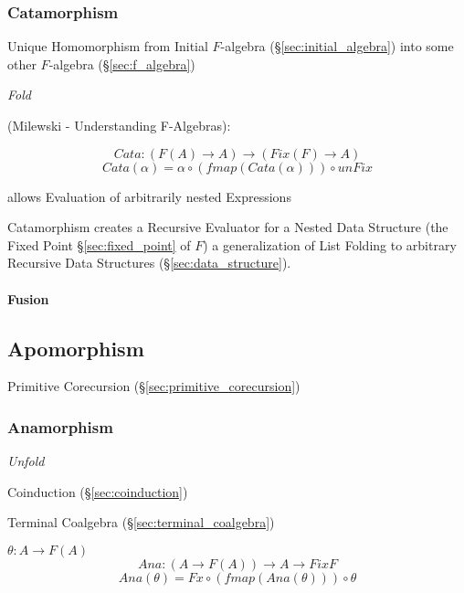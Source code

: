 \subsubsection{Catamorphism}\label{sec:catamorphism}

Unique Homomorphism from Initial $F$-algebra
(\S\ref{sec:initial_algebra}) into some other $F$-algebra
(\S\ref{sec:f_algebra})

\emph{Fold}

(Milewski - Understanding F-Algebras):

\[
  Cata : (F (A) \rightarrow A) \rightarrow (Fix (F) \rightarrow A)
\]\[
  Cata (\alpha) = \alpha \circ (fmap (Cata (\alpha))) \circ unFix
\]

allows Evaluation of arbitrarily nested Expressions

Catamorphism creates a Recursive Evaluator for a Nested Data Structure
(the Fixed Point \S\ref{sec:fixed_point} of $F$) a generalization of
List Folding to arbitrary Recursive Data Structures
(\S\ref{sec:data_structure}).



\paragraph{Fusion}\label{sec:fusion}



\subsection{Apomorphism}\label{sec:apomorphism}

Primitive Corecursion (\S\ref{sec:primitive_corecursion})



\subsubsection{Anamorphism}\label{sec:anamorphism}

\emph{Unfold}

Coinduction (\S\ref{sec:coinduction})

Terminal Coalgebra (\S\ref{sec:terminal_coalgebra})

$\theta : A \rightarrow F(A)$
\[
  Ana : (A \rightarrow F (A)) \rightarrow A \rightarrow Fix F
\]\[
  Ana (\theta) = Fx \circ (fmap (Ana (\theta))) \circ \theta
\]



